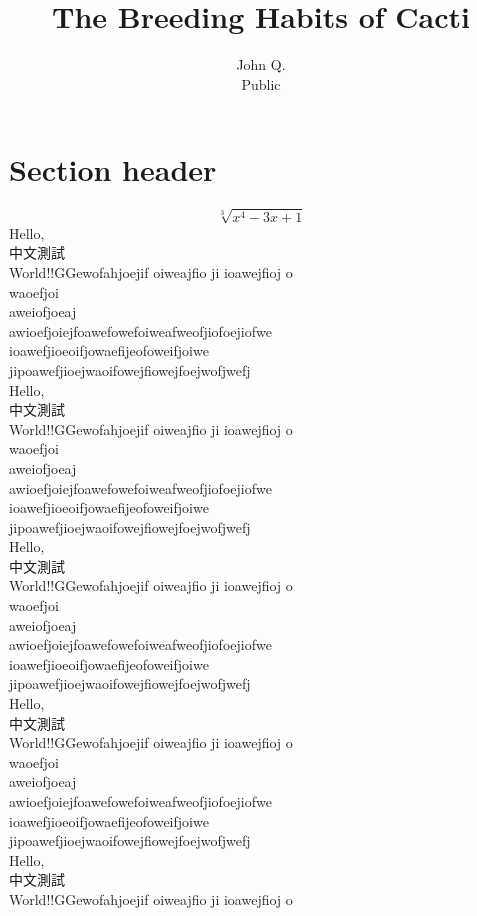 \documentclass[12pt]{article}
\title{The Breeding Habits of Cacti}
\author{John Q.\\ Public}
\begin{document}
\maketitle
\section{Section header}
\[\sqrt[3]{x^4-3x+1}\]
Hello, \\中文測試\\World!!GGewofahjoejif oiweajfio ji ioawejfioj o\\
waoefjoi\\
aweiofjoeaj\\
awioefjoiejfoawefowefoiweafweofjiofoejiofwe\\
ioawefjioeoifjowaefijeofoweifjoiwe\\
jipoawefjioejwaoifowejfiowejfoejwofjwefj\\
Hello, \\中文測試\\World!!GGewofahjoejif oiweajfio ji ioawejfioj o\\
waoefjoi\\
aweiofjoeaj\\
\newpage
awioefjoiejfoawefowefoiweafweofjiofoejiofwe\\
ioawefjioeoifjowaefijeofoweifjoiwe\\
jipoawefjioejwaoifowejfiowejfoejwofjwefj\\Hello, \\中文測試\\World!!GGewofahjoejif oiweajfio ji ioawejfioj o\\
waoefjoi\\
aweiofjoeaj\\
awioefjoiejfoawefowefoiweafweofjiofoejiofwe\\
ioawefjioeoifjowaefijeofoweifjoiwe\\
jipoawefjioejwaoifowejfiowejfoejwofjwefj\\Hello, \\中文測試\\World!!GGewofahjoejif oiweajfio ji ioawejfioj o\\
waoefjoi\\
aweiofjoeaj\\
awioefjoiejfoawefowefoiweafweofjiofoejiofwe\\
ioawefjioeoifjowaefijeofoweifjoiwe\\
jipoawefjioejwaoifowejfiowejfoejwofjwefj\\Hello, \\中文測試\\World!!GGewofahjoejif oiweajfio ji ioawejfioj o\\
\end{document}
